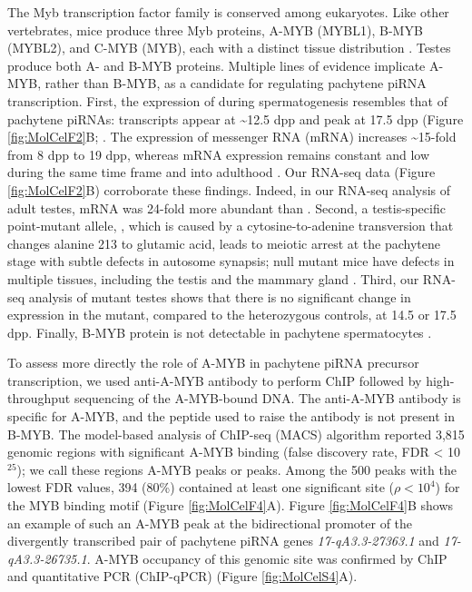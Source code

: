     The Myb transcription factor family is conserved among eukaryotes. Like other vertebrates, mice produce three Myb proteins, A-MYB (MYBL1), B-MYB (MYBL2), and C-MYB (MYB), each with a distinct tissue distribution \citep{Mettus1994, Trauth1994, Latham1996, Oh1999}. Testes produce both A- and B-MYB proteins. Multiple lines of evidence implicate A-MYB, rather than B-MYB, as a candidate for regulating pachytene piRNA transcription. First, the expression of \amyb{} during spermatogenesis resembles that of pachytene piRNAs: \amyb{} transcripts appear at \textasciitilde12.5 dpp and peak at 17.5 dpp (Figure \ref{fig:MolCelF2}B; \citep{Bolcun-Filas2011}. The expression of \amyb{} messenger RNA (mRNA) increases \textasciitilde15-fold from 8 dpp to 19 dpp, whereas \bmyb{} mRNA expression remains constant and low during the same time frame and into adulthood \citep{Horvath2009}. Our RNA-seq data (Figure \ref{fig:MolCelF2}B) corroborate these findings. Indeed, in our RNA-seq analysis of adult testes, \amyb{} mRNA was 24-fold more abundant than \bmyb{}. Second, a testis-specific \amyb{} point-mutant allele, \mybrepro, which is caused by a cytosine-to-adenine transversion that changes alanine 213 to glutamic acid, leads to meiotic arrest at the pachytene stage with subtle defects in autosome synapsis; \amyb{} null mutant mice have defects in multiple tissues, including the testis and the mammary gland \citep{Toscani1997, Bolcun-Filas2011}. Third, our RNA-seq analysis of \amyb{} mutant testes shows that there is no significant change in \bmyb{} expression in the mutant, compared to the heterozygous controls, at 14.5 or 17.5 dpp. Finally, B-MYB protein is not detectable in pachytene spermatocytes \citep{Horvath2009}.

    To assess more directly the role of A-MYB in pachytene piRNA precursor transcription, we used anti-A-MYB antibody to perform ChIP followed by high-throughput sequencing of the A-MYB-bound DNA. The anti-A-MYB antibody is specific for A-MYB, and the peptide used to raise the antibody is not present in B-MYB. The model-based analysis of ChIP-seq (MACS) algorithm \citep{Zhang2008} reported 3,815 genomic regions with significant A-MYB binding (false discovery rate, FDR < 10$^{25}$); we call these regions A-MYB peaks or peaks. Among the 500 peaks with the lowest FDR values, 394 (80\%) contained at least one significant site ($\rho < 10^{4}$) for the MYB binding motif (Figure \ref{fig:MolCelF4}A). Figure \ref{fig:MolCelF4}B shows an example of such an A-MYB peak at the bidirectional promoter of the divergently transcribed pair of pachytene piRNA genes \textit{17-qA3.3-27363.1} and \textit{17-qA3.3-26735.1}. A-MYB occupancy of this genomic site was confirmed by ChIP and quantitative PCR (ChIP-qPCR) (Figure \ref{fig:MolCelS4}A).

